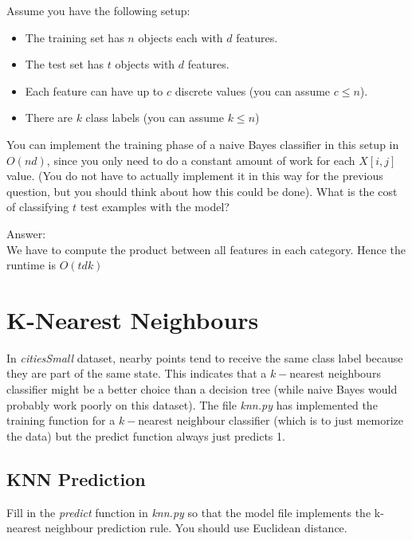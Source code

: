 \documentclass{article}
\def\ans#1{\par\gre{Answer: #1}}
\def\blu#1{{\color{blu}#1}}
\def\gre#1{{\color{gre}#1}}
\def\items#1{\begin{itemize}#1\end{itemize}}
\begin{document}
Assume you have the following setup:
\items{
\item The training set has $n$ objects each with $d$ features.
\item The test set has $t$ objects with $d$ features.
\item Each feature can have up to $c$ discrete values (you can assume $c \leq n$).
\item There are $k$ class labels (you can assume $k \leq n$)
}
You can implement the training phase of a naive Bayes classifier in this setup in $O(nd)$, since you only need to do a constant amount of work for each $X[i,j]$ value. (You do not have to actually implement it in this way for the previous question, but you should think about how this could be done). \blu{What is the cost of classifying $t$ test examples with the model?}

\ans{\\
We have to compute the product between all features in each category. Hence the runtime is $O(tdk)$}
\pagebreak

\section{K-Nearest Neighbours}


In \emph{citiesSmall} dataset, nearby points tend to receive the same class label because they are part of the same state. This indicates that a $k-$nearest neighbours classifier might be a better choice than a decision tree (while naive Bayes would probably work poorly on this dataset). The file \emph{knn.py} has implemented the training function for a $k-$nearest neighbour classifier (which is to just memorize the data) but the predict function always just predicts 1.


\subsection{KNN Prediction}

Fill in the \emph{predict} function in \emph{knn.py} so that the model file implements the k-nearest neighbour prediction rule. You should use Euclidean distance.
\end{document}
